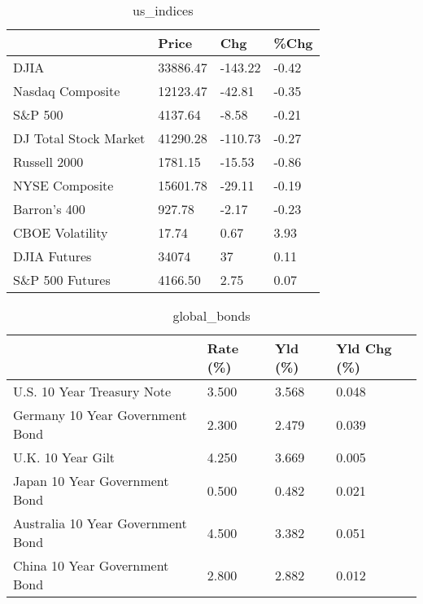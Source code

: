 \documentclass{article}%
\begin{document}
%


\begin{table}[htbp]%
\caption{us\_indices}%
\centering%
\begin{adjustbox}{width=1\textwidth}%
\begin{tabular}{llll}
\toprule
                      &    Price &     Chg &  \%Chg \\
\midrule
                 DJIA & 33886.47 & -143.22 & -0.42 \\
     Nasdaq Composite & 12123.47 &  -42.81 & -0.35 \\
              S\&P 500 &  4137.64 &   -8.58 & -0.21 \\
DJ Total Stock Market & 41290.28 & -110.73 & -0.27 \\
         Russell 2000 &  1781.15 &  -15.53 & -0.86 \\
       NYSE Composite & 15601.78 &  -29.11 & -0.19 \\
         Barron's 400 &   927.78 &   -2.17 & -0.23 \\
      CBOE Volatility &    17.74 &    0.67 &  3.93 \\
         DJIA Futures &    34074 &      37 &  0.11 \\
      S\&P 500 Futures &  4166.50 &    2.75 &  0.07 \\
\bottomrule
\end{tabular}
%
\end{adjustbox}%
\end{table}

%


\begin{table}[htbp]%
\caption{global\_bonds}%
\centering%
\begin{adjustbox}{width=1\textwidth}%
\begin{tabular}{llll}
\toprule
                                  & Rate (\%) & Yld (\%) & Yld Chg (\%) \\
\midrule
       U.S. 10 Year Treasury Note &    3.500 &   3.568 &       0.048 \\
  Germany 10 Year Government Bond &    2.300 &   2.479 &       0.039 \\
                U.K. 10 Year Gilt &    4.250 &   3.669 &       0.005 \\
    Japan 10 Year Government Bond &    0.500 &   0.482 &       0.021 \\
Australia 10 Year Government Bond &    4.500 &   3.382 &       0.051 \\
    China 10 Year Government Bond &    2.800 &   2.882 &       0.012 \\
\bottomrule
\end{tabular}
%
\end{adjustbox}%
\end{table}
\end{document}
